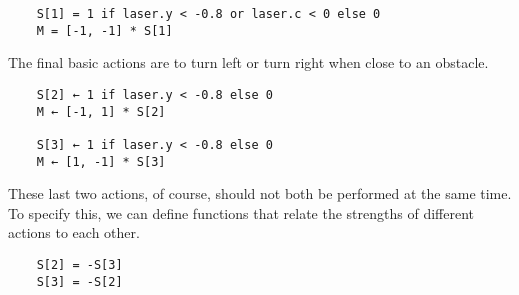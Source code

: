 \documentclass[conference]{IEEEtran}
\begin{document}
\begin{lstlisting}
	S[1] = 1 if laser.y < -0.8 or laser.c < 0 else 0
	M = [-1, -1] * S[1]
\end{lstlisting}

The final basic actions are to turn left or turn right when
close to an obstacle. 

\begin{lstlisting}
	S[2] ← 1 if laser.y < -0.8 else 0
	M ← [-1, 1] * S[2]

	S[3] ← 1 if laser.y < -0.8 else 0
	M ← [1, -1] * S[3]
\end{lstlisting}

These last two actions, of course, should not both be
performed at the same time. To specify this, we can define
functions that relate the strengths of different actions to
each other.

\begin{lstlisting}
	S[2] = -S[3]
	S[3] = -S[2]
\end{lstlisting}
\end{document}
